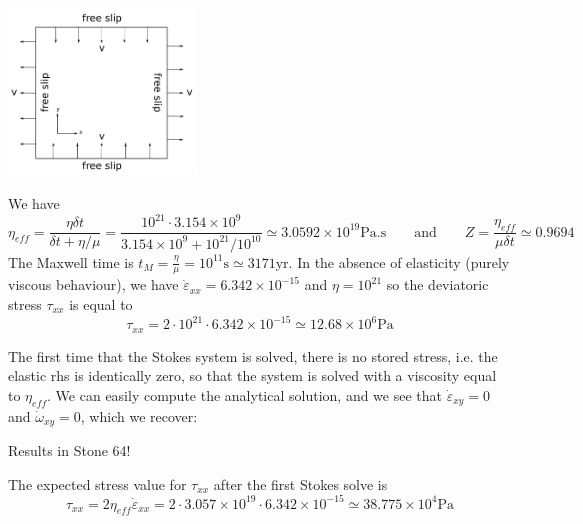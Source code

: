 \begin{center}
\includegraphics[width=5cm]{images/viscoelasticity/stress_buildup_setup.png}\\
\end{center}

We have
\[
\eta_{eff} 
= \frac{\eta \delta t}{\delta t + \eta/\mu} 
= \frac{10^{21} \cdot 3.154\times 10^{9}}{3.154\times 10^{9} + 10^{21}/10^{10}} 
\simeq 
3.0592 \times 10^{19}\text{Pa.s}
\qquad
\text{and}
\qquad
Z=\frac{\eta_{eff}}{\mu \delta t} 
\simeq 
0.9694
\]
The Maxwell time is $t_M = \frac{\eta}{\mu} = 10^{11}\text{s} \simeq 3171\text{yr}$.
In the absence of elasticity (purely viscous behaviour), we have
$\dot{\varepsilon}_{xx} = 6.342\times 10^{-15}$
and $\eta=10^{21}$ so the
deviatoric stress $\tau_{xx}$ is equal to
\[
\tau_{xx} = 2 \cdot 10^{21} \cdot 6.342\times 10^{-15} \simeq 12.68 \times 10^6 \text{Pa}
\]

The first time that the Stokes system is solved, there is no stored stress, i.e. the
elastic rhs is identically zero, so that the system is solved with a viscosity equal to
$\eta_{eff}$.
We can easily compute the analytical solution, and we see that $\dot{\varepsilon}_{xy}=0$
and $\dot{\omega}_{xy}=0$, which we recover:

Results in Stone 64!


The expected stress value for $\tau_{xx}$ after the first Stokes solve is
\[
\tau_{xx} = 2 \eta_{eff} \dot{\varepsilon}_{xx} 
= 2 \cdot 3.057\times 10^{19} \cdot 6.342\times 10^{-15} 
\simeq 38.775 \times 10^4 \text{Pa}
\]



